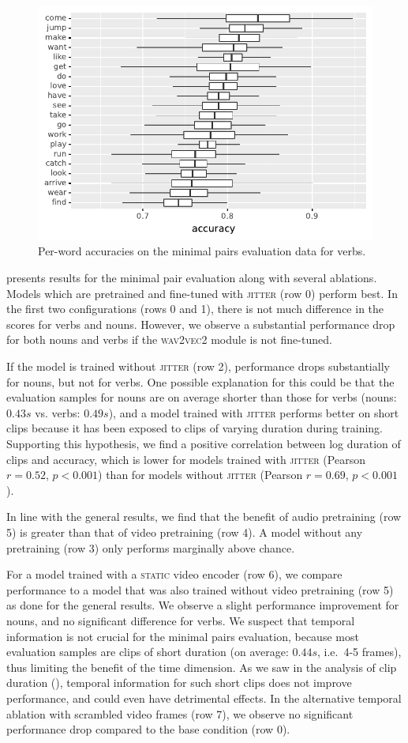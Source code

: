 \begin{figure}[htb]
	\centering
	\includegraphics[width=.5\textwidth]{results/targeted_triplets/acc_per_word_VERB.pdf}
	\caption{Per-word accuracies on the minimal pairs evaluation data for 
	verbs.}
	\label{fig:accuracy_targeted_triplets_verbs}
\end{figure}


 presents results for the minimal pair 
evaluation along with several ablations. Models which are 
pretrained and fine-tuned with \textsc{jitter} (row 0) perform best. In the 
first two configurations (rows 0 and 1), there is not much difference in the scores for 
verbs and nouns. However, we observe a substantial performance drop for both nouns and verbs if 
the \textsc{wav2vec2} module is not fine-tuned.

If the model is trained without \textsc{jitter} (row 2), performance drops substantially
for nouns, but not for verbs. One possible explanation for this could be that 
the evaluation samples for nouns are on average shorter than those for verbs 
(nouns: $0.43s$ vs. verbs: $0.49s$), and a model trained with \textsc{jitter} 
performs better on short clips because it has been exposed to clips of varying 
duration during training. Supporting this hypothesis, we find a positive 
correlation between log duration of clips and accuracy, which is lower for 
models trained with \textsc{jitter} (Pearson $r= 0.52$, $p < 0.001$) than for 
models without \textsc{jitter} (Pearson $r= 0.69$, $p < 0.001$).

In line with the general results, we find that the benefit of audio pretraining 
(row 5) is greater than that of video pretraining (row 4). A model without any 
pretraining (row 3) only performs marginally above chance.

For a model trained with a \textsc{static} video encoder (row 6), we compare 
performance to a model that was also trained without video pretraining (row 5) 
as done for the general results. We observe a slight performance 
improvement for nouns, and no significant difference for
verbs.
We suspect that temporal information is not crucial for the minimal pairs evaluation, 
because most evaluation samples are clips of short duration (on average: 
$0.44s$, i.e.\ 4-5 frames), thus limiting the benefit of the time dimension.
As we saw in the analysis of clip duration (), 
temporal information for such short clips does not improve performance, and 
could even have detrimental effects. In the alternative temporal ablation 
with scrambled video frames (row 7), we observe no significant performance 
drop compared to the base condition (row 0).

